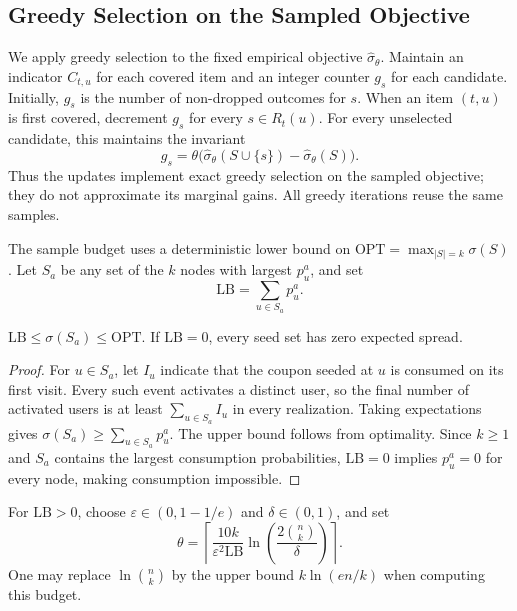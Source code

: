 \documentclass[sigconf]{acmart}
\begin{document}
\subsection{Greedy Selection on the Sampled Objective}
\label{sec:greedy-selection}

We apply greedy selection to the fixed empirical objective
$\hat\sigma_\theta$. Maintain an indicator $C_{t,u}$ for each
covered item and an integer counter $g_s$ for each candidate.
Initially, $g_s$ is the number of non-dropped outcomes for $s$.
When an item $(t,u)$ is first covered, decrement $g_s$ for every
$s\in R_t(u)$. For every unselected candidate, this maintains
the invariant
\[
 g_s=\theta\bigl(\hat\sigma_\theta(S\cup\{s\})
                       -\hat\sigma_\theta(S)\bigr).
\]
Thus the updates implement exact greedy selection on the sampled
objective; they do not approximate its marginal gains.
All greedy iterations reuse the same samples.

The sample budget uses a deterministic lower bound on
$\mathrm{OPT}=\max_{|S|=k}\sigma(S)$. Let $S_a$ be any set of
the $k$ nodes with largest $p_u^a$, and set
\begin{equation}
\label{eq:opt-lower-bound}
  \mathrm{LB}=\sum_{u\in S_a}p_u^a.
\end{equation}

\begin{lemma}
\label{lem:lower-bound}
$\mathrm{LB}\le\sigma(S_a)\le\mathrm{OPT}$.
If $\mathrm{LB}=0$, every seed set has zero expected spread.
\end{lemma}
\begin{proof}\renewcommand{\qedsymbol}{}
For $u\in S_a$, let $I_u$ indicate that the coupon seeded at $u$
is consumed on its first visit. Every such event activates a
distinct user, so the final number of activated users is at least
$\sum_{u\in S_a}I_u$ in every realization.
Taking expectations gives $\sigma(S_a)\ge\sum_{u\in S_a}p_u^a$.
The upper bound follows from optimality. Since $k\ge1$ and $S_a$
contains the largest consumption probabilities, $\mathrm{LB}=0$
implies $p_u^a=0$ for every node, making consumption impossible.
\end{proof}

For $\mathrm{LB}>0$, choose $\varepsilon\in(0,1-1/e)$ and
$\delta\in(0,1)$, and set
\begin{equation}
\label{eq:sample-budget}
 \theta=\left\lceil
 \frac{10k}{\varepsilon^2\mathrm{LB}}
 \ln\left(\frac{2\binom nk}{\delta}\right)
 \right\rceil.
\end{equation}
One may replace $\ln\binom nk$ by the upper bound $k\ln(en/k)$
when computing this budget.
\end{document}
